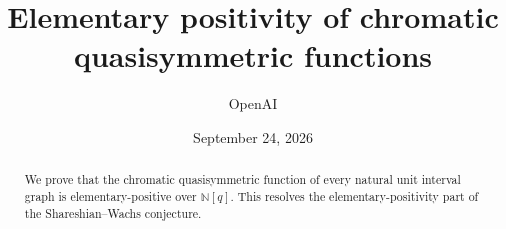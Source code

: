 \documentclass[11pt]{article}
\title{Elementary positivity of chromatic\\quasisymmetric functions}
\author{OpenAI}
\date{September 24, 2026}
\numberwithin{equation}{section}
\theoremstyle{definition}
\theoremstyle{remark}
\newcommand{\N}{\mathbb N}
\begin{document}
\maketitle
\begin{abstract}
We prove that the chromatic quasisymmetric function of every natural unit
interval graph is elementary-positive over $\N[q]$. This resolves the
elementary-positivity part of the Shareshian--Wachs conjecture.
\end{abstract}
\tableofcontents







\clearpage


\end{document}
